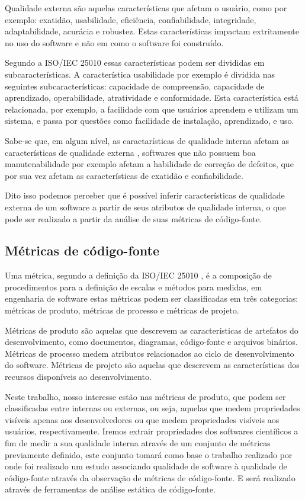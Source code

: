 \documentclass[qual, classic, a4paper]{ufbathesis}
\begin{document}
Qualidade externa são aquelas características que afetam o usuário, como por
exemplo: exatidão, usabilidade, eficiência, confiabilidade, integridade,
adaptabilidade, acurácia e robustez. Estas características impactam
extritamente no uso do software e não em como o software foi construído.

Segundo a ISO/IEC 25010 \cite{iso2011iec25010} essas características podem ser
divididas em subcaracterísticas. A característica usabilidade por exemplo é
dividida nas seguintes subcaracterísticas: capacidade de compreensão,
capacidade de aprendizado, operabilidade, atratividade e conformidade. Esta
característica está relacionada, por exemplo, a facilidade com que usuários aprendem e
utilizam um sistema, e passa por questões como facilidade de instalação,
aprendizado, e uso.

Sabe-se que, em algum nível, as caractarísticas de qualidade interna afetam as
características de qualidade externa \cite{McConnell2004}, softwares que não
possuem boa manutenabilidade por exemplo afetam a habilidade de correção de
defeitos, que por sua vez afetam as características de exatidão e
confiabilidade.

Dito isso podemos perceber que é possível inferir características de qualidade
externa de um software a partir de seus atributos de qualidade interna, o que
pode ser realizado a partir da análise de suas métricas de código-fonte.

\subsection{Métricas de código-fonte}

Uma métrica, segundo a definição da ISO/IEC 25010 \cite{iso2011iec25010}, é a
composição de procedimentos para a definição de escalas e métodos para
medidas, em engenharia de software estas métricas podem ser classificadas em três categorias: métricas de
produto, métricas de processo e métricas de projeto.

Métricas de produto são aquelas que
descrevem as características de artefatos do desenvolvimento, como documentos,
diagramas, código-fonte e arquivos binários. Métricas de processo medem atributos relacionados
ao ciclo de desenvolvimento do software. Métricas de projeto são aquelas
que descrevem as características dos recursos disponíveis ao desenvolvimento.

Neste trabalho, nosso interesse estão nas métricas de produto, que podem ser
classificadas entre internas ou externas, ou seja, aquelas que medem
propriedades visíveis apenas aos desenvolvedores ou que medem propriedades
visíveis aos usuários, respectivamente. Iremos extrair propriedades dos
softwares científicos a fim de medir a sua qualidade interna através de um
conjunto de métricas previamente definido, este conjunto tomará como base o
trabalho realizado por  onde foi realizado um estudo
associando qualidade de software à qualidade de código-fonte através da
observação de métricas de código-fonte. E será realizado através de
ferramentas de análise estática de código-fonte.
\end{document}
